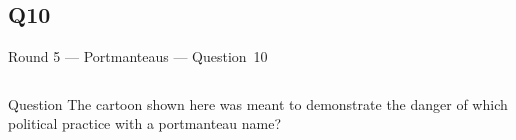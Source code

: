 \documentclass[11pt]{beamer}
\begin{document}
\subsection*{Q10}
\begin{frame}[t]{Round 5 --- Portmanteaus --- \mbox{Question 10}}
\vspace{-0.5em}
\begin{columns}[T,totalwidth=\linewidth]
\begin{column}{0.32\linewidth}
\begin{block}{Question}
The cartoon shown here was meant to demonstrate the danger of which political practice with a portmanteau name?
\end{block}
\end{column}
\begin{column}{0.65\linewidth}
\begin{center}
\texttt{[image: \{Images/gerrymander]}.jpg}
\end{center}
\end{column}
\end{columns}
\end{frame}
\end{document}
